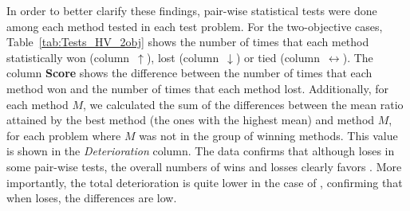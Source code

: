 In order to better clarify these findings, pair-wise statistical tests were done among each method tested in each test problem.
%
For the two-objective cases, Table~\ref{tab:Tests_HV_2obj} shows the number of times that each method statistically won 
(column~$\uparrow$), lost (column~$\downarrow$) or tied (column~$\leftrightarrow$).
%
The column \textbf{Score} shows the difference between the number of times that each method won and the number of times that each 
method lost.
%
Additionally, for each method $M$, we calculated the sum of the differences between the mean \HV{} ratio attained by the best method 
(the ones with the highest mean) and method $M$, for each problem where $M$ was not in the group of winning methods.
%
This value is shown in the \textit{Deterioration} column.
%
The data confirms that although \AVSDMOEAD{} loses in some pair-wise tests, the overall numbers of wins and 
losses clearly favors \AVSDMOEAD{}.
%
More importantly, the total deterioration is quite lower in the case of \AVSDMOEAD{}, confirming that when \AVSDMOEAD{} loses, 
the differences are low.





